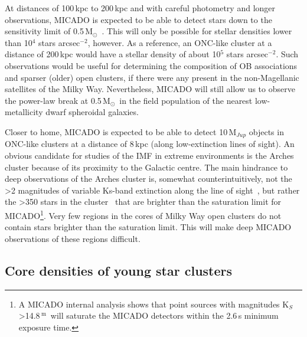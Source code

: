 \documentclass[referee]{aa}
\newcommand{\m}{$^\mathrm{m}$~}
\newcommand{\msun}{M$_\odot$~}
\newcommand{\h}[1]{$^{#1}$}
\newcommand{\spae}{stars arcsec$^{-2}$}
\begin{document}
At distances of 100\,kpc to 200\,kpc and with careful photometry and longer observations, MICADO is expected to be able to detect stars down to the sensitivity limit of 0.5\,\msun.
This will only be possible for stellar densities lower than 10\h4 \spae, however.
As a reference, an ONC-like cluster at a distance of 200\,kpc would have a stellar density of about 10\h5 \spae.
Such observations would be useful for determining the composition of OB associations and sparser (older) open clusters, if there were any present in the non-Magellanic satellites of the Milky Way.
Nevertheless, MICADO will still allow us to observe the power-law break at 0.5\,\msun in the field population of the nearest low-metallicity dwarf spheroidal galaxies.

Closer to home, MICADO is expected to be able to detect 10\,M$_{Jup}$ objects in ONC-like clusters at a distance of 8\,kpc (along low-extinction lines of sight).
An obvious candidate for studies of the IMF in extreme environments is the Arches cluster because of its proximity to the Galactic centre.
The main hindrance to deep observations of the Arches cluster is, somewhat counterintuitively, not the \textgreater2 magnitudes of variable Ks-band extinction along the line of sight~\citep{espinoza2009}, but rather the \textgreater350 stars in the cluster~\citep{galacticnucleaus} that are brighter than the saturation limit for MICADO\footnote{A MICADO internal analysis shows that point sources with magnitudes K$_S$\textgreater14.8\,\m will saturate the MICADO detectors within the 2.6\,s minimum exposure time.}.
Very few regions in the cores of Milky Way open clusters do not contain stars brighter than the saturation limit.
This will make deep MICADO observations of these regions difficult.


\subsection{Core densities of young star clusters}
  \label{subsec:core_densities}
\end{document}

